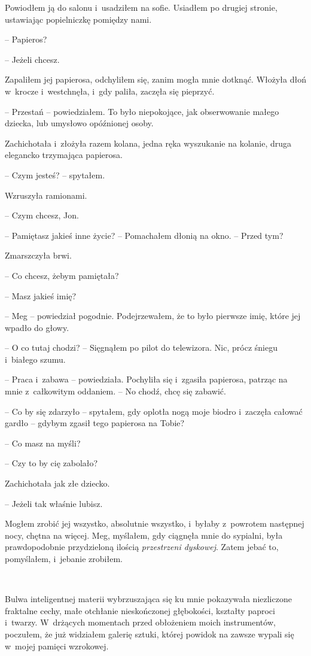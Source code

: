 \documentclass[oneside,polish,11pt,sfheadings]{mwbk}
\begin{document}
Powiodłem ją do salonu i~usadziłem na sofie. Usiadłem po drugiej
stronie, ustawiając popielniczkę pomiędzy nami.

-- Papieros?

-- Jeżeli chcesz.

Zapaliłem jej papierosa, odchyliłem się, zanim mogła mnie dotknąć.
Włożyła dłoń w~krocze i~westchnęła, i~gdy paliła, zaczęła się pieprzyć.

-- Przestań -- powiedziałem. To było niepokojące, jak obserwowanie małego
dziecka, lub umysłowo opóźnionej osoby.

Zachichotała i~złożyła razem kolana, jedna ręka wyszukanie na kolanie,
druga elegancko trzymająca papierosa.

-- Czym jesteś? -- spytałem.

Wzruszyła ramionami. 

-- Czym chcesz, Jon.

-- Pamiętasz jakieś inne życie? -- Pomachałem dłonią na okno. -- Przed tym?

Zmarszczyła brwi. 

-- Co chcesz, żebym pamiętała?

-- Masz jakieś imię?

-- Meg -- powiedział pogodnie. Podejrzewałem, że to było pierwsze imię,
które jej wpadło do głowy.

-- O co tutaj chodzi? -- Sięgnąłem po pilot do telewizora. Nic, prócz
śniegu i~białego szumu.

-- Praca i~zabawa -- powiedziała. Pochyliła się i~zgasiła papierosa,
patrząc na mnie z~całkowitym oddaniem. -- No chodź, chcę się zabawić.

-- Co by się zdarzyło -- spytałem, gdy oplotła nogą moje biodro i~zaczęła
całować gardło -- gdybym zgasił tego papierosa na Tobie?

-- Co masz na myśli?

-- Czy to by cię zabolało?

Zachichotała jak złe dziecko. 

-- Jeżeli tak właśnie lubisz.

Mogłem zrobić jej wszystko, absolutnie wszystko, i~byłaby z~powrotem
następnej nocy, chętna na więcej. Meg, myślałem, gdy ciągnęła mnie do
sypialni, była prawdopodobnie przydzieloną ilością \emph{przestrzeni
dyskowej}. Zatem jebać to, pomyślałem, i~jebanie zrobiłem.

~

Bulwa inteligentnej materii wybrzuszająca się ku mnie pokazywała
niezliczone fraktalne cechy, małe otchłanie nieskończonej głębokości,
kształty paproci i~twarzy. W~drżących momentach przed obłożeniem moich
instrumentów, poczułem, że już widziałem galerię sztuki, której powidok
na zawsze wypali się w~mojej pamięci wzrokowej.
\end{document}
